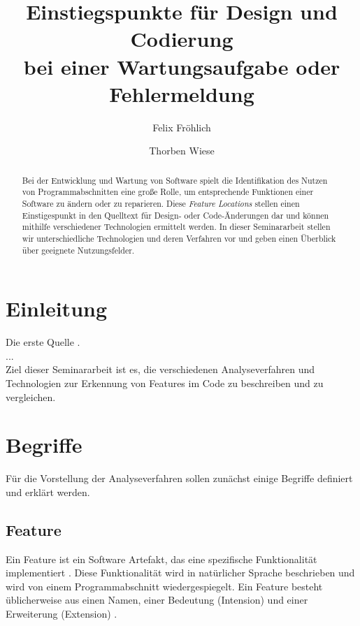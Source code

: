 \documentclass[runningheads,a4paper]{llncs}
\begin{document}
\title{Einstiegspunkte für Design und Codierung \\bei einer Wartungsaufgabe oder Fehlermeldung}


\author{Felix Fröhlich \and Thorben Wiese}



\maketitle

\begin{abstract}
Bei der Entwicklung und Wartung von Software spielt die Identifikation des Nutzen von Programmabschnitten eine große Rolle, um entsprechende Funktionen einer Software zu ändern oder zu reparieren. Diese \textit{Feature Locations} stellen einen Einstigespunkt in den Quelltext für Design- oder Code-Änderungen dar und können mithilfe verschiedener Technologien ermittelt werden. In dieser Seminararbeit stellen wir unterschiedliche Technologien und deren Verfahren vor und geben einen Überblick über geeignete Nutzungsfelder.
\end{abstract}

\section{Einleitung}

Die erste Quelle \cite{survey}.\\
...\\
Ziel dieser Seminararbeit ist es, die verschiedenen Analyseverfahren und Technologien zur Erkennung von Features im Code zu beschreiben und zu vergleichen.

\section{Begriffe}

Für die Vorstellung der Analyseverfahren sollen zunächst einige Begriffe definiert und erklärt werden.

\subsection*{Feature}
Ein Feature ist ein Software Artefakt, das eine spezifische Funktionalität implementiert \cite{feature}. Diese Funktionalität wird in natürlicher Sprache beschrieben und wird von einem Programmabschnitt wiedergespiegelt. Ein Feature besteht üblicherweise aus einen Namen, einer Bedeutung (Intension) und einer Erweiterung (Extension) \cite{rajlich-chen}.
\end{document}
